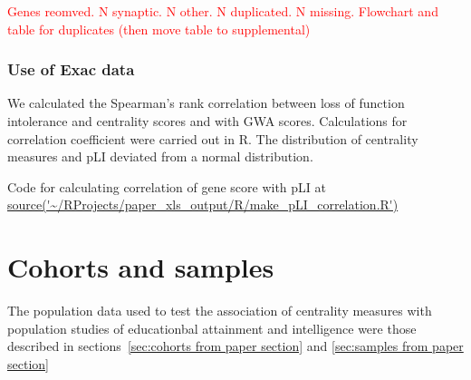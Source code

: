 




 \textcolor{red}{ Genes reomved. N synaptic. N other. N duplicated. N missing. Flowchart and table for duplicates (then move table to supplemental)}

\subsubsection{Use of Exac data}

We calculated the Spearman's rank correlation between loss of function intolerance and centrality scores and with GWA scores. Calculations for correlation coefficient were carried out in R. The distribution of centrality measures and pLI deviated from a normal distribution. 


Code for calculating correlation of gene score with pLI at \url{source('~/RProjects/paper_xls_output/R/make_pLI_correlation.R')}
\section{Cohorts and samples}
\label{Centrality:cohorts and samples}
The population data used to test the association of centrality measures with population studies of educationbal attainment and intelligence were those described in sections~\ref{sec:cohorts from paper section} and \ref{sec:samples from paper section}




